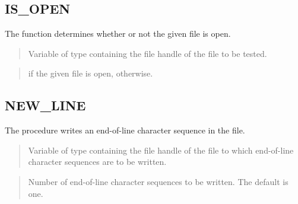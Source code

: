 \documentclass[letterpaper,10pt,english,openany,oneside]{sphinxmanual}
\begin{document}
\subsection{IS\_OPEN}
\label{\detokenize{utl_file:is-open}}
The  function determines whether or not the given file is open.
\begin{quote}

\end{quote}


\begin{quote}

Variable of type  containing the file handle of the file to be
tested.
\end{quote}

\begin{quote}

 if the given file is open,  otherwise.
\end{quote}


\subsection{NEW\_LINE}
\label{\detokenize{utl_file:new-line}}
The  procedure writes an end-of-line character sequence in the
file.
\begin{quote}

\end{quote}


\begin{quote}

Variable of type  containing the file handle of the file to
which end-of-line character sequences are to be written.
\end{quote}

\begin{quote}

Number of end-of-line character sequences to be written. The default is
one.
\end{quote}
\end{document}
